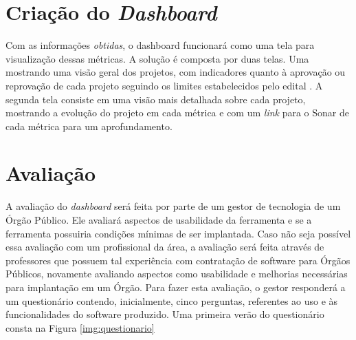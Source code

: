 \section{Criação do \textit{Dashboard}}
Com as informações \textit{obtidas}, o dashboard funcionará como uma tela para visualização dessas métricas. A solução é composta por duas telas. Uma mostrando uma visão geral dos projetos, com indicadores quanto à aprovação ou reprovação de cada projeto seguindo os limites estabelecidos pelo edital \cite{edital}. A segunda tela consiste em uma visão mais detalhada sobre cada projeto, mostrando a evolução do projeto em cada métrica e com um \textit{link} para o Sonar de cada métrica para um aprofundamento.

\section{Avaliação}
A avaliação do \textit{dashboard} será feita por parte de um gestor de tecnologia de um Órgão Público. Ele avaliará aspectos de usabilidade da ferramenta e se a ferramenta possuiria condições mínimas de ser implantada. Caso não seja possível essa avaliação com um profissional da área, a avaliação será feita através de professores que possuem tal experiência com contratação de software para Órgãos Públicos, novamente avaliando aspectos como usabilidade e melhorias necessárias para implantação em um Órgão.
Para fazer esta avaliação, o gestor responderá a um questionário contendo, inicialmente, cinco perguntas, referentes ao uso e às funcionalidades do software produzido. Uma primeira verão do questionário consta na Figura \ref{img:questionario}

